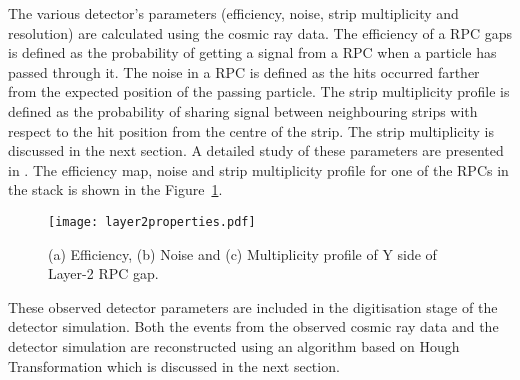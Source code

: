 The various detector's parameters (efficiency, noise, strip
multiplicity and resolution) are calculated using the cosmic ray data.
The efficiency of a RPC gaps is defined as the probability of getting
a signal from a RPC when a particle has passed through it. The noise
in a RPC is defined as the hits occurred farther from the expected
position of the passing particle. The strip multiplicity profile is
defined as the probability of sharing signal between neighbouring
strips with respect to the hit position from the centre of the strip.
The strip multiplicity is discussed in the next section.
A detailed study of these parameters are presented in \cite{pethu1}.
The efficiency map, noise and strip multiplicity
profile for one of the RPCs in the stack is shown in the
Figure~\ref{fig:layer2y}.
\begin{figure}[h]
  \centering
  \texttt{[image: layer2properties.pdf]} 
  \caption{(a) Efficiency, (b) Noise and (c) Multiplicity profile of
    Y side of Layer-2 RPC gap.}
  \label{fig:layer2y}
\end{figure}
These observed detector parameters are included in the digitisation
stage of the detector simulation. Both the events from the observed
cosmic ray data and the detector simulation are reconstructed using
an algorithm based on Hough Transformation which is discussed in the
next section.

